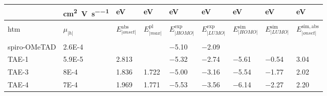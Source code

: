 \begin{table}
\begin{xltabular}[c]{1.05\linewidth}{@{} >{\hsize}Y | >{\hsize}Y >{\hsize}Y >{\hsize}Y >{\hsize}Y >{\hsize}Y >{\hsize}Y >{\hsize}Y Y @{}}
		   		   & \footnotesize\si{\square\cm\per\V\per\s} & \footnotesize\si{\eV} & \footnotesize\si{\eV} & \footnotesize\si{\eV} & \footnotesize\si{\eV} & \footnotesize\si{\eV} & \footnotesize\si{\eV} & \footnotesize\si{\eV} \\[1mm]
		\hline
		\endfirsthead
		\\
		\hline
				\small\gls{htm} & \small$\mu_|h|$ & \small$E^{\mathrm{abs}}_|onset|$ & \small$E^{\mathrm{pl}}_|max|$ & \small$E^{\mathrm{exp}}_|HOMO|$ & \small$E^{\mathrm{exp}}_|LUMO|$ & \small$E^{\mathrm{sim}}_|HOMO|$ & \small$E^{\mathrm{sim}}_|LUMO|$ & \small$E^{\mathrm{sim,abs}}_|onset|$\\ 
		\hline
		\endhead
		\hline
		\\
		\endfoot
		\hline
		\endlastfoot
		\rule[-1ex]{0pt}{3ex}
		spiro-OMeTAD 		& \num{2.6E-4} 	& 				& 					& \num{-5.10}	& \num{-2.09}	& 				&  				& \\
		TAE-1				& \num{5.9E-5} 	& \num{2.813}	& 					& \num{-5.32}	& \num{-2.74}	& \num{-5.61}	& \num{-0.54}	& \num{3.04} \\
		TAE-3 				& \num{8E-4} 	& \num{1.836}	& \num{1.722}		& \num{-5.00}	& \num{-3.16}	& \num{-5.54}	& \num{-1.77}	& \num{2.02} \\
		TAE-4 				& \num{7E-4} 	& \num{1.969}	& \num{1.771}		& \num{-5.53}	& \num{-3.56}	& \num{-6.14}	& \num{-2.27}	& \num{2.20} \\
	\end{xltabular}
\end{table}

